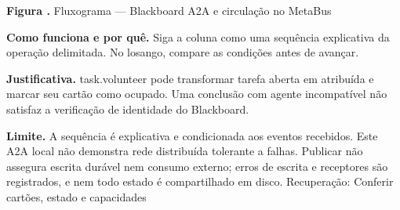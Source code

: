 {\small\textbf{Figura \thefigure.} Fluxograma --- Blackboard A2A e circulação no MetaBus}\par\smallskip
\noindent\textbf{Como funciona e por quê.} Siga a coluna como uma sequência explicativa da operação delimitada. No losango, compare as condições antes de avançar.\par
\noindent\textbf{Justificativa.} task.volunteer pode transformar tarefa aberta em atribuída e marcar seu cartão como ocupado. Uma conclusão com agente incompatível não satisfaz a verificação de identidade do Blackboard.\par
\noindent\textbf{Limite.} A sequência é explicativa e condicionada aos eventos recebidos. Este A2A local não demonstra rede distribuída tolerante a falhas. Publicar não assegura escrita durável nem consumo externo; erros de escrita e receptores são registrados, e nem todo estado é compartilhado em disco. Recuperação: Conferir cartões, estado e capacidades\par\smallskip
{}
